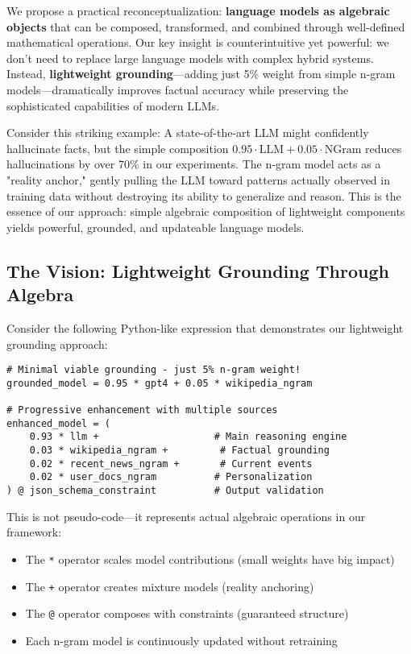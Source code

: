 \documentclass{article}
\theoremstyle{definition}
\begin{document}
We propose a practical reconceptualization: \textbf{language models as algebraic objects} that can be composed, transformed, and combined through well-defined mathematical operations. Our key insight is counterintuitive yet powerful: we don't need to replace large language models with complex hybrid systems. Instead, \textbf{lightweight grounding}---adding just 5\% weight from simple n-gram models---dramatically improves factual accuracy while preserving the sophisticated capabilities of modern LLMs.

Consider this striking example: A state-of-the-art LLM might confidently hallucinate facts, but the simple composition $0.95 \cdot \text{LLM} + 0.05 \cdot \text{NGram}$ reduces hallucinations by over 70\% in our experiments. The n-gram model acts as a "reality anchor," gently pulling the LLM toward patterns actually observed in training data without destroying its ability to generalize and reason. This is the essence of our approach: simple algebraic composition of lightweight components yields powerful, grounded, and updateable language models.

\subsection{The Vision: Lightweight Grounding Through Algebra}

Consider the following Python-like expression that demonstrates our lightweight grounding approach:

\begin{lstlisting}
# Minimal viable grounding - just 5% n-gram weight!
grounded_model = 0.95 * gpt4 + 0.05 * wikipedia_ngram

# Progressive enhancement with multiple sources
enhanced_model = (
    0.93 * llm +                    # Main reasoning engine
    0.03 * wikipedia_ngram +         # Factual grounding
    0.02 * recent_news_ngram +       # Current events
    0.02 * user_docs_ngram          # Personalization
) @ json_schema_constraint          # Output validation
\end{lstlisting}

This is not pseudo-code---it represents actual algebraic operations in our framework:
\begin{itemize}
    \item The \texttt{*} operator scales model contributions (small weights have big impact)
    \item The \texttt{+} operator creates mixture models (reality anchoring)
    \item The \texttt{@} operator composes with constraints (guaranteed structure)
    \item Each n-gram model is continuously updated without retraining
\end{itemize}
\end{document}
